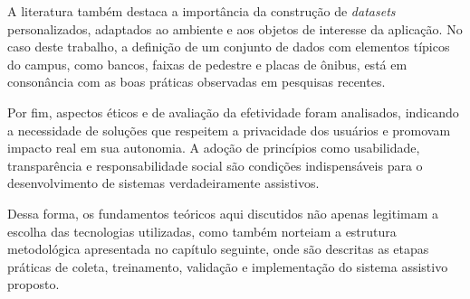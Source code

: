 A literatura também destaca a importância da construção de \textit{datasets} personalizados, adaptados ao ambiente e aos objetos de interesse da aplicação. No caso deste trabalho, a definição de um conjunto de dados com elementos típicos do campus, como bancos, faixas de pedestre e placas de ônibus, está em consonância com as boas práticas observadas em pesquisas recentes.

Por fim, aspectos éticos e de avaliação da efetividade foram analisados, indicando a necessidade de soluções que respeitem a privacidade dos usuários e promovam impacto real em sua autonomia. A adoção de princípios como usabilidade, transparência e responsabilidade social são condições indispensáveis para o desenvolvimento de sistemas verdadeiramente assistivos.

Dessa forma, os fundamentos teóricos aqui discutidos não apenas legitimam a escolha das tecnologias utilizadas, como também norteiam a estrutura metodológica apresentada no capítulo seguinte, onde são descritas as etapas práticas de coleta, treinamento, validação e implementação do sistema assistivo proposto.